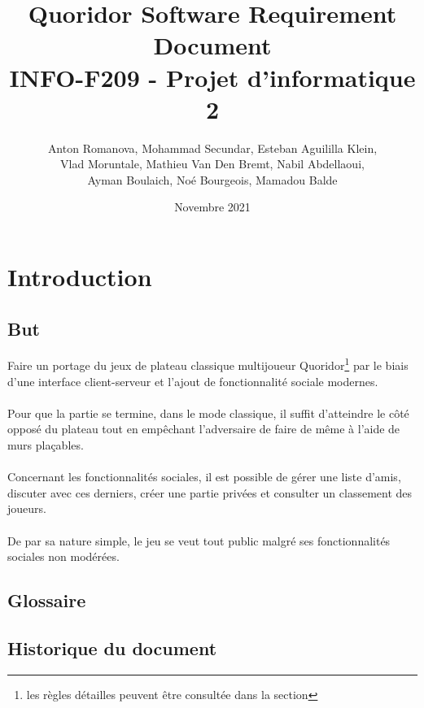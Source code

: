 \documentclass[french, utf8]{article}
\title{Quoridor Software Requirement Document \\
\large INFO-F209 - Projet d'informatique 2}
\subtitle
\author{Anton Romanova, Mohammad Secundar, Esteban Aguililla Klein, \\
Vlad Moruntale, Mathieu Van Den Bremt, Nabil Abdellaoui, \\
Ayman Boulaich, Noé Bourgeois, Mamadou Balde
}
\date{Novembre 2021}
\begin{document}
\maketitle
\tableofcontents
\newpage


\section{Introduction}
\subsection{But}
Faire un portage du jeux de plateau classique multijoueur Quoridor\footnote{les règles détailles peuvent être consultée dans la section } par le biais d'une interface client-serveur et l'ajout de fonctionnalité sociale modernes.
\\ \\
Pour que la partie se termine, dans le mode classique, il suffit d'atteindre le côté opposé du plateau tout en empêchant l'adversaire de faire de même à l'aide de murs plaçables.    %
\\ \\
Concernant les fonctionnalités sociales, il est possible de gérer une liste d'amis, discuter avec ces derniers, créer une partie privées et consulter un classement des joueurs.
\\ \\
De par sa nature simple, le jeu se veut tout public malgré ses fonctionnalités sociales non modérées.  %

\subsection{Glossaire}

\printglossary

\subsection{Historique du document}
\end{document}
